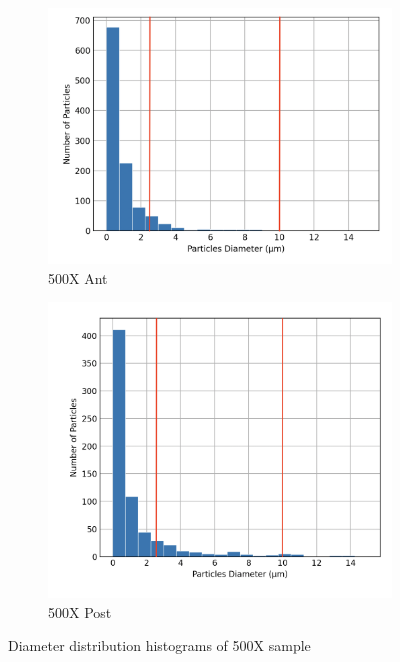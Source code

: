 \begin{figure}[H]
\centering
\begin{subfigure}{.5\textwidth}
  \centering
  \includegraphics[width=1\linewidth]{images/500X_ant_dis.png}
  \caption{500X Ant}
  \label{fig:500xant}
\end{subfigure}%
\begin{subfigure}{.5\textwidth}
  \centering
  \includegraphics[width=0.9\linewidth]{images/500X_post_dis.png}
  \caption{500X Post}
  \label{fig:500xpost}
\end{subfigure}
\caption{Diameter distribution histograms of 500X sample}
\label{fig:2}
\end{figure}

